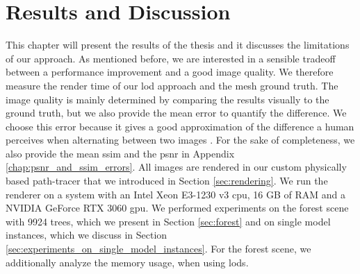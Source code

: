 \chapter{Results and Discussion}
\label{chap:results_and_discussion}
This chapter will present the results of the thesis and it discusses the limitations of our approach.
As mentioned before, we are interested in a sensible tradeoff between a performance improvement and a good image quality.
We therefore measure the render time of our \ac{lod} approach and the mesh ground truth.
The image quality is mainly determined by comparing the results visually to the ground truth, but we also provide the mean \FLIP \cite{flip} error to quantify the difference.
We choose this error because it gives a good approximation of the difference a human perceives when alternating between two images \cite{flip}.
For the sake of completeness, we also provide the mean \ac{ssim} and the \ac{psnr} in Appendix \ref{chap:psnr_and_ssim_errors}.
All images are rendered in our custom physically based path-tracer that we introduced in Section \ref{sec:rendering}.
We run the renderer on a system with an Intel Xeon E3-1230 v3 \ac{cpu}, 16 GB of RAM and a NVIDIA GeForce RTX 3060 \ac{gpu}.
We performed experiments on the forest scene with 9924 trees, which we present in Section \ref{sec:forest} and on single model instances, which we discuss in Section \ref{sec:experiments_on_single_model_instances}.
For the forest scene, we additionally analyze the memory usage, when using \acsp{lod}.

